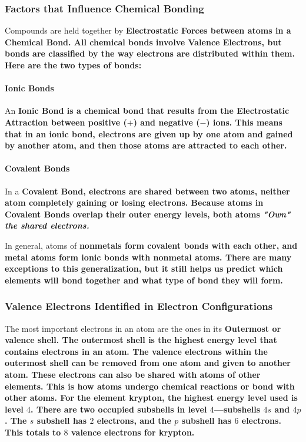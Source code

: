 
\subsubsection*{Factors that Influence Chemical Bonding}

Compounds are held together by \bf{Electrostatic Forces} between atoms in a \bf{Chemical Bond}. All chemical bonds involve \bf{Valence Electrons}, but bonds are classified by the way electrons are distributed within them. Here are the two types of bonds:

\paragraph{Ionic Bonds} An \bf{Ionic Bond} is a chemical bond that results from the \bf{Electrostatic Attraction} between positive ($+$) and negative ($-$) ions. This means that in an ionic bond, electrons are given up by one atom and gained by another atom, and then those atoms are attracted to each other.

\paragraph{Covalent Bonds} In a \bf{Covalent Bond}, electrons are shared between two atoms, neither atom completely gaining or losing electrons. Because atoms in \bf{Covalent Bonds} overlap their outer energy levels, both atoms \it{"Own"} the shared electrons.

In general, atoms of \bf{nonmetals} form \bf{covalent bonds} with each other, and \bf{metal atoms} form \bf{ionic bonds} with \bf{nonmetal atoms}. There are many exceptions to this generalization, but it still helps us predict which elements will bond together and what type of bond they will form.

\subsubsection*{Valence Electrons Identified in Electron Configurations}

The most important electrons in an atom are the ones in its \bf{Outermost} or \bf{valence shell}. The \bf{outermost shell} is the highest energy level that contains electrons in an atom. The valence electrons within the \bf{outermost shell} can be removed from one atom and given to another atom. These electrons can also be shared with atoms of other elements. This is how atoms undergo \bf{chemical reactions} or bond with other atoms. For the element krypton, the highest energy level used is level $4$. There are two occupied \bf{subshells} in level $4$—\bf{subshells} $4s$ and $4p$. The $s$ \bf{subshell} has $2$ electrons, and the $p$ \bf{subshell} has $6$ electrons. This totals to $8$ \bf{valence electrons} for krypton.

